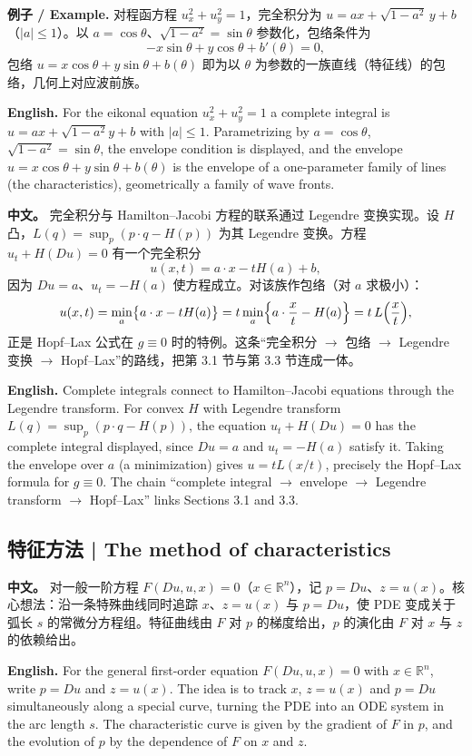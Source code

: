 \documentclass[UTF8,11pt,a4paper]{ctexart}
\newcommand{\APS}[2]{\par\noindent\textbf{中文。} #1\par\noindent\textbf{English.} #2\par\smallskip}
\newcommand{\EN}[1]{\par\noindent \textbf{English.} #1\par}
\newcommand{\EX}[2]{\par\noindent \textbf{例子 / Example.} #1\par\EN{#2}}
\newcommand{\R}{\mathbb{R}}
\begin{document}
\EX{对程函方程 $u_x^2+u_y^2=1$，完全积分为 $u=ax+\sqrt{1-a^2}\,y+b$（$|a|\le1$）。以 $a=\cos\theta$、$\sqrt{1-a^2}=\sin\theta$ 参数化，包络条件为
\[
-x\sin\theta+y\cos\theta+b'(\theta)=0,
\]
包络 $u=x\cos\theta+y\sin\theta+b(\theta)$ 即为以 $\theta$ 为参数的一族直线（特征线）的包络，几何上对应波前族。}{For the eikonal equation $u_x^2+u_y^2=1$ a complete integral is $u=ax+\sqrt{1-a^2}y+b$ with $|a|\le1$. Parametrizing by $a=\cos\theta$, $\sqrt{1-a^2}=\sin\theta$, the envelope condition is displayed, and the envelope $u=x\cos\theta+y\sin\theta+b(\theta)$ is the envelope of a one-parameter family of lines (the characteristics), geometrically a family of wave fronts.}

\APS{完全积分与 Hamilton--Jacobi 方程的联系通过 Legendre 变换实现。设 $H$ 凸，$L(q)=\sup_p(p\cdot q-H(p))$ 为其 Legendre 变换。方程 $u_t+H(Du)=0$ 有一个完全积分
\[
u(x,t)=a\cdot x-tH(a)+b,
\]
因为 $Du=a$、$u_t=-H(a)$ 使方程成立。对该族作包络（对 $a$ 求极小）：
\[
u(x,t)=\min_a\bigl\{a\cdot x-tH(a)\bigr\}=t\min_a\Bigl\{a\cdot\frac xt-H(a)\Bigr\}=t\,L\Bigl(\frac xt\Bigr),
\]
正是 Hopf--Lax 公式在 $g\equiv0$ 时的特例。这条``完全积分 $\to$ 包络 $\to$ Legendre 变换 $\to$ Hopf--Lax''的路线，把第 3.1 节与第 3.3 节连成一体。}{Complete integrals connect to Hamilton--Jacobi equations through the Legendre transform. For convex $H$ with Legendre transform $L(q)=\sup_p(p\cdot q-H(p))$, the equation $u_t+H(Du)=0$ has the complete integral displayed, since $Du=a$ and $u_t=-H(a)$ satisfy it. Taking the envelope over $a$ (a minimization) gives $u=tL(x/t)$, precisely the Hopf--Lax formula for $g\equiv0$. The chain ``complete integral $\to$ envelope $\to$ Legendre transform $\to$ Hopf--Lax'' links Sections 3.1 and 3.3.}

\subsection{特征方法 | The method of characteristics}
\APS{对一般一阶方程 $F(Du,u,x)=0$（$x\in\R^n$），记 $p=Du$、$z=u(x)$。核心想法：沿一条特殊曲线同时追踪 $x$、$z=u(x)$ 与 $p=Du$，使 PDE 变成关于弧长 $s$ 的常微分方程组。特征曲线由 $F$ 对 $p$ 的梯度给出，$p$ 的演化由 $F$ 对 $x$ 与 $z$ 的依赖给出。}{For the general first-order equation $F(Du,u,x)=0$ with $x\in\R^n$, write $p=Du$ and $z=u(x)$. The idea is to track $x$, $z=u(x)$ and $p=Du$ simultaneously along a special curve, turning the PDE into an ODE system in the arc length $s$. The characteristic curve is given by the gradient of $F$ in $p$, and the evolution of $p$ by the dependence of $F$ on $x$ and $z$.}
\end{document}
